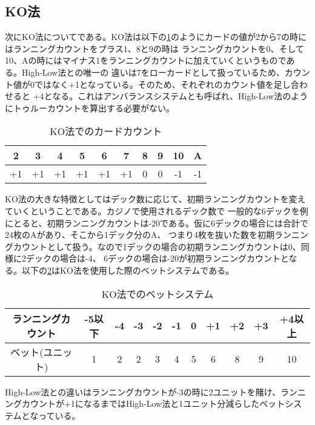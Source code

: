 \subsection{KO法}
次にKO法についてである。KO法は以下の\ref{koc}のようにカードの値が2から7の時にはランニングカウントをプラス1、8と9の時は
ランニングカウントを0、そして10、Aの時にはマイナス1をランニングカウントに加えていくというものである。High-Low法との唯一の
違いは7をローカードとして扱っているため、カウント値が0ではなく+1となっている。そのため、それぞれのカウント値を足し合わせると
+4となる。これはアンバランスシステムとも呼ばれ、High-Low法のようにトゥルーカウントを算出する必要がない。
  \begin{table}[H]
    \centering
    \label{koc}
    \caption{KO法でのカードカウント}
    \begin{tabular}{|c|c|c|c|c|c|c|c|c|c|} \hline
      2&3&4&5&6&7&8&9&10&A \\ \hline
      +1&+1&+1&+1&+1&+1&0&0&-1&-1 \\ \hline
    \end{tabular}
  \end{table}

KO法の大きな特徴としてはデック数に応じて、初期ランニングカウントを変えていくということである。カジノで使用されるデック数で
一般的な6デックを例にとると、初期ランニングカウントは-20である。仮に6デックの場合には合計で24枚のAがあり、そこから1デック分のA、
つまり4枚を抜いた数を初期ランニングカウントとして扱う。なので1デックの場合の初期ランニングカウントは0、同様に2デックの場合は-4、
6デックの場合は-20が初期ランニングカウントとなる。以下の\ref{kob}はKO法を使用した際のベットシステムである。

  \begin{table}[H]
    \centering
    \label{kob}
    \caption{KO法でのベットシステム}
    \begin{tabular}{|c|c|c|c|c|c|c|c|c|c|c|} \hline
      ランニングカウント&-5以下&-4&-3&-2&-1&0&+1&+2&+3&+4以上 \\ \hline
      ベット(ユニット)&1&2&2&3&4&5&6&8&9&10 \\ \hline
    \end{tabular}
  \end{table}
High-Low法との違いはランニングカウントが-3の時に2ユニットを賭け、ランニングカウントが+1になるまではHigh-Low法と1ユニット分減らしたベットシステムとなっている。
